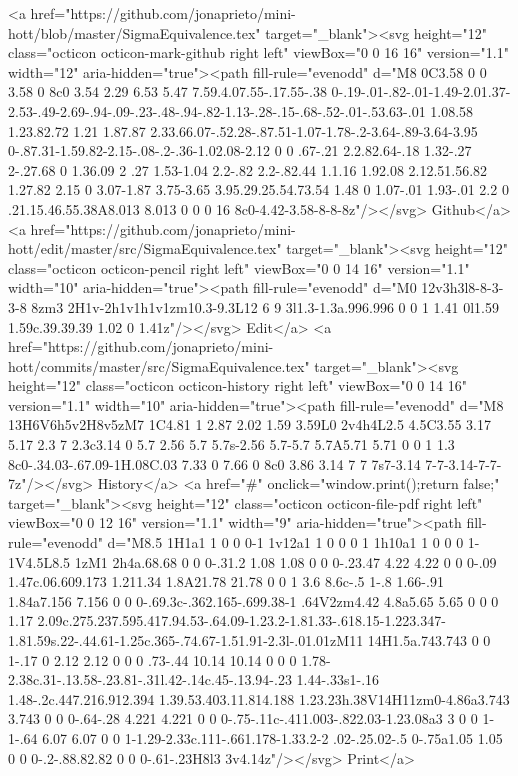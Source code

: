       <a href="https://github.com/jonaprieto/mini-hott/blob/master/SigmaEquivalence.tex" target="_blank"><svg height="12" class="octicon octicon-mark-github right left" viewBox="0 0 16 16" version="1.1" width="12" aria-hidden="true"><path fill-rule="evenodd" d="M8 0C3.58 0 0 3.58 0 8c0 3.54 2.29 6.53 5.47 7.59.4.07.55-.17.55-.38 0-.19-.01-.82-.01-1.49-2.01.37-2.53-.49-2.69-.94-.09-.23-.48-.94-.82-1.13-.28-.15-.68-.52-.01-.53.63-.01 1.08.58 1.23.82.72 1.21 1.87.87 2.33.66.07-.52.28-.87.51-1.07-1.78-.2-3.64-.89-3.64-3.95 0-.87.31-1.59.82-2.15-.08-.2-.36-1.02.08-2.12 0 0 .67-.21 2.2.82.64-.18 1.32-.27 2-.27.68 0 1.36.09 2 .27 1.53-1.04 2.2-.82 2.2-.82.44 1.1.16 1.92.08 2.12.51.56.82 1.27.82 2.15 0 3.07-1.87 3.75-3.65 3.95.29.25.54.73.54 1.48 0 1.07-.01 1.93-.01 2.2 0 .21.15.46.55.38A8.013 8.013 0 0 0 16 8c0-4.42-3.58-8-8-8z"/></svg> Github</a>
      <a href="https://github.com/jonaprieto/mini-hott/edit/master/src/SigmaEquivalence.tex" target="_blank"><svg height="12" class="octicon octicon-pencil right left" viewBox="0 0 14 16" version="1.1" width="10" aria-hidden="true"><path fill-rule="evenodd" d="M0 12v3h3l8-8-3-3-8 8zm3 2H1v-2h1v1h1v1zm10.3-9.3L12 6 9 3l1.3-1.3a.996.996 0 0 1 1.41 0l1.59 1.59c.39.39.39 1.02 0 1.41z"/></svg> Edit</a>
      <a href="https://github.com/jonaprieto/mini-hott/commits/master/src/SigmaEquivalence.tex" target="_blank"><svg height="12" class="octicon octicon-history right left" viewBox="0 0 14 16" version="1.1" width="10" aria-hidden="true"><path fill-rule="evenodd" d="M8 13H6V6h5v2H8v5zM7 1C4.81 1 2.87 2.02 1.59 3.59L0 2v4h4L2.5 4.5C3.55 3.17 5.17 2.3 7 2.3c3.14 0 5.7 2.56 5.7 5.7s-2.56 5.7-5.7 5.7A5.71 5.71 0 0 1 1.3 8c0-.34.03-.67.09-1H.08C.03 7.33 0 7.66 0 8c0 3.86 3.14 7 7 7s7-3.14 7-7-3.14-7-7-7z"/></svg> History</a>
      <a  href="#" onclick="window.print();return false;" target="_blank"><svg height="12" class="octicon octicon-file-pdf right left" viewBox="0 0 12 16" version="1.1" width="9" aria-hidden="true"><path fill-rule="evenodd" d="M8.5 1H1a1 1 0 0 0-1 1v12a1 1 0 0 0 1 1h10a1 1 0 0 0 1-1V4.5L8.5 1zM1 2h4a.68.68 0 0 0-.31.2 1.08 1.08 0 0 0-.23.47 4.22 4.22 0 0 0-.09 1.47c.06.609.173 1.211.34 1.8A21.78 21.78 0 0 1 3.6 8.6c-.5 1-.8 1.66-.91 1.84a7.156 7.156 0 0 0-.69.3c-.362.165-.699.38-1 .64V2zm4.42 4.8a5.65 5.65 0 0 0 1.17 2.09c.275.237.595.417.94.53-.64.09-1.23.2-1.81.33-.618.15-1.223.347-1.81.59s.22-.44.61-1.25c.365-.74.67-1.51.91-2.3l-.01.01zM11 14H1.5a.743.743 0 0 1-.17 0 2.12 2.12 0 0 0 .73-.44 10.14 10.14 0 0 0 1.78-2.38c.31-.13.58-.23.81-.31l.42-.14c.45-.13.94-.23 1.44-.33s1-.16 1.48-.2c.447.216.912.394 1.39.53.403.11.814.188 1.23.23h.38V14H11zm0-4.86a3.743 3.743 0 0 0-.64-.28 4.221 4.221 0 0 0-.75-.11c-.411.003-.822.03-1.23.08a3 3 0 0 1-1-.64 6.07 6.07 0 0 1-1.29-2.33c.111-.661.178-1.33.2-2 .02-.25.02-.5 0-.75a1.05 1.05 0 0 0-.2-.88.82.82 0 0 0-.61-.23H8l3 3v4.14z"/></svg> Print</a>
